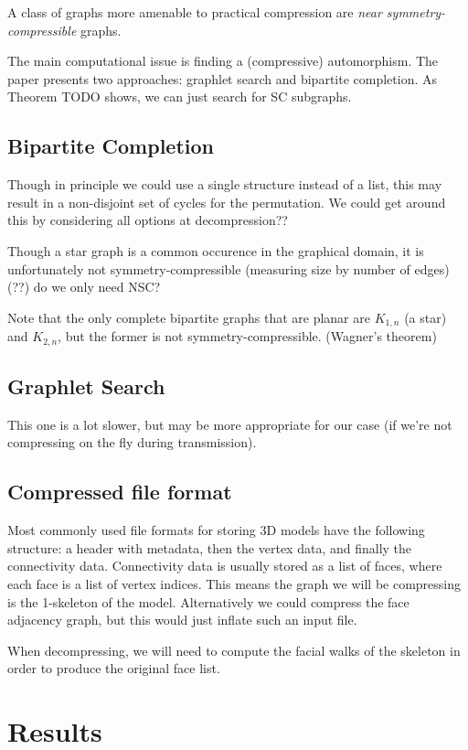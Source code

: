 \documentclass{egpubl}
\begin{document}
A class of graphs more amenable to practical compression are \textit{near symmetry-compressible} graphs. 


The main computational issue is finding a (compressive) automorphism. The paper presents two approaches: graphlet search and bipartite completion.
As Theorem TODO shows, we can just search for SC subgraphs.

\subsection{Bipartite Completion}

Though in principle we could use a single structure instead of a list, this may result in a non-disjoint set of cycles for the permutation. We could get around this by considering all options at decompression??

Though a star graph is a common occurence in the graphical domain, it is unfortunately not symmetry-compressible (measuring size by number of edges) (??) do we only need NSC?

Note that the only complete bipartite graphs that are planar are $K_{1,n}$ (a star) and $K_{2,n}$, but the former is not symmetry-compressible. (Wagner's theorem)

\subsection{Graphlet Search}
This one is a lot slower, but may be more appropriate for our case (if we're not compressing on the fly during transmission).

\subsection{Compressed file format}
Most commonly used file formats for storing 3D models have the following structure: a header with metadata, then the vertex data, and finally the connectivity data. Connectivity data is usually stored as a list of faces, where each face is a list of vertex indices. This means the graph we will be compressing is the 1-skeleton of the model. Alternatively we could compress the face adjacency graph, but this would just inflate such an input file.

When decompressing, we will need to compute the facial walks of the skeleton in order to produce the original face list.

\section{Results}
\end{document}
